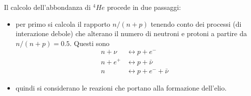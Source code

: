 Il calcolo dell'abbondanza di $^4He$ procede in due passaggi:
\begin{itemize}
\item per primo si calcola il rapporto $n/(n+p)$ tenendo conto dei processi (di
  interazione debole) che alterano il numero di neutroni e protoni a partire da
  $n/(n+p)=0.5$.  Questi sono
  \begin{subequations}
    \begin{align}
      n + \nu  & \longleftrightarrow p  + e^-             \\
      n + e^+  & \longleftrightarrow p +        {\bar\nu} \\
      n        & \longleftrightarrow p + e^-  + {\bar\nu}
    \end{align}
    \label{w1571}
  \end{subequations}
\item quindi si considerano le reazioni che portano alla formazione dell'elio.
\end{itemize}

